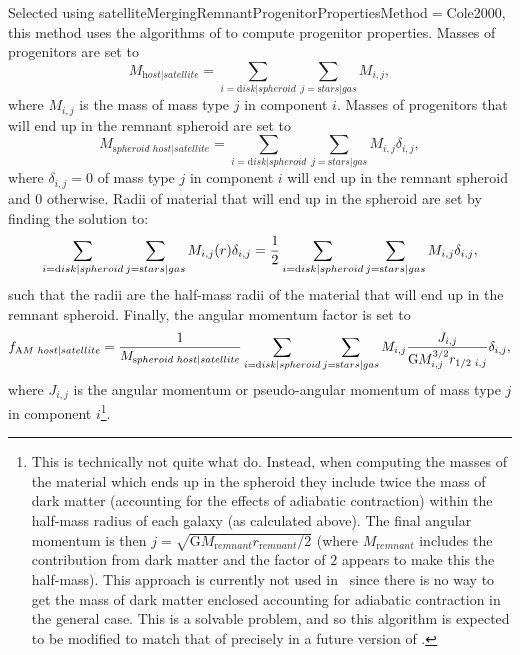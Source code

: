 Selected using {\normalfont \ttfamily satelliteMergingRemnantProgenitorPropertiesMethod}$=${\normalfont \ttfamily Cole2000}, this method uses the algorithms of \cite{cole_hierarchical_2000} to compute progenitor properties. Masses of progenitors are set to
\begin{equation}
 M_{\mathrm host|satellite} = \sum_{i={\mathrm disk|spheroid}} \sum_{j={\mathrm stars|gas}} M_{i,j},
\end{equation}
where $M_{i,j}$ is the mass of mass type $j$ in \gls{component} $i$. Masses of progenitors that will end up in the remnant spheroid are set to
\begin{equation}
 M_{\mathrm spheroid\,\,host|satellite} = \sum_{i={\mathrm disk|spheroid}} \sum_{j={\mathrm stars|gas}} M_{i,j} \delta_{i,j},
\end{equation}
where $\delta_{i,j}=0$ of mass type $j$ in \gls{component} $i$ will end up in the remnant spheroid and $0$ otherwise. Radii of material that will end up in the spheroid are set by finding the solution to:
\begin{equation}
\sum_{i={\mathrm disk|spheroid}} \sum_{j={\mathrm stars|gas}} M_{i,j}(r) \delta_{i,j} = {1 \over 2} \sum_{i={\mathrm disk|spheroid}} \sum_{j={\mathrm stars|gas}} M_{i,j} \delta_{i,j},
\end{equation}
such that the radii are the half-mass radii of the material that will end up in the remnant spheroid. Finally, the angular momentum factor is set to
\begin{equation}
 f_{\mathrm AM\,\,host|satellite} = {1 \over M_{\mathrm spheroid\,\,host|satellite}} \sum_{i={\mathrm disk|spheroid}} \sum_{j={\mathrm stars|gas}} M_{i,j} {J_{i,j} \over {\mathrm G} M^{3/2}_{i,j} r_{1/2\,\,i,j}} \delta_{i,j},
\end{equation}
where $J_{i,j}$ is the angular momentum or pseudo-angular momentum of mass type $j$ in \gls{component} $i$\footnote{This is technically not quite what \protect\cite{cole_hierarchical_2000} do. Instead, when computing the masses of the material which ends up in the spheroid they include twice the mass of dark matter (accounting for the effects of adiabatic contraction) within the half-mass radius of each galaxy (as calculated above). The final angular momentum is then $j=\sqrt{{\mathrm G} M_{\mathrm remnant} r_{\mathrm remnant}/2}$ (where $M_{\mathrm remnant}$ includes the contribution from dark matter and the factor of $2$ appears to make this the half-mass). This approach is currently not used in \protect\glc\ since there is no way to get the mass of dark matter enclosed accounting for adiabatic contraction in the general case. This is a solvable problem, and so this algorithm is expected to be modified to match that of \protect\cite{cole_hierarchical_2000} precisely in a future version of \protect\glc.}.

